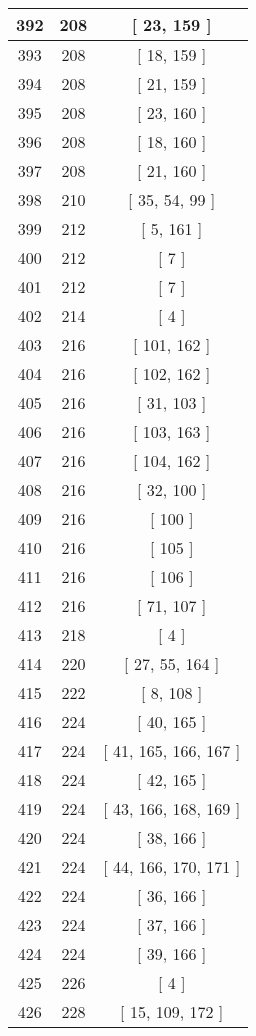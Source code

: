 \begin{center}
\begin{longtable}[H]{|| c c c ||}
\hline
392 & 208 & [ 23, 159 ] \\ 
\hline
393 & 208 & [ 18, 159 ] \\ 
\hline
394 & 208 & [ 21, 159 ] \\ 
\hline
395 & 208 & [ 23, 160 ] \\ 
\hline
396 & 208 & [ 18, 160 ] \\ 
\hline
397 & 208 & [ 21, 160 ] \\ 
\hline
398 & 210 & [ 35, 54, 99 ] \\ 
\hline
399 & 212 & [ 5, 161 ] \\ 
\hline
400 & 212 & [ 7 ] \\ 
\hline
401 & 212 & [ 7 ] \\ 
\hline
402 & 214 & [ 4 ] \\ 
\hline
403 & 216 & [ 101, 162 ] \\ 
\hline
404 & 216 & [ 102, 162 ] \\ 
\hline
405 & 216 & [ 31, 103 ] \\ 
\hline
406 & 216 & [ 103, 163 ] \\ 
\hline
407 & 216 & [ 104, 162 ] \\ 
\hline
408 & 216 & [ 32, 100 ] \\ 
\hline
409 & 216 & [ 100 ] \\ 
\hline
410 & 216 & [ 105 ] \\ 
\hline
411 & 216 & [ 106 ] \\ 
\hline
412 & 216 & [ 71, 107 ] \\ 
\hline
413 & 218 & [ 4 ] \\ 
\hline
414 & 220 & [ 27, 55, 164 ] \\ 
\hline
415 & 222 & [ 8, 108 ] \\ 
\hline
416 & 224 & [ 40, 165 ] \\ 
\hline
417 & 224 & [ 41, 165, 166, 167 ] \\ 
\hline
418 & 224 & [ 42, 165 ] \\ 
\hline
419 & 224 & [ 43, 166, 168, 169 ] \\ 
\hline
420 & 224 & [ 38, 166 ] \\ 
\hline
421 & 224 & [ 44, 166, 170, 171 ] \\ 
\hline
422 & 224 & [ 36, 166 ] \\ 
\hline
423 & 224 & [ 37, 166 ] \\ 
\hline
424 & 224 & [ 39, 166 ] \\ 
\hline
425 & 226 & [ 4 ] \\ 
\hline
426 & 228 & [ 15, 109, 172 ] \\ 

\end{longtable}
\end{center}
